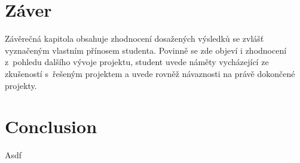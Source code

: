 \chapter*{Záver}

Závěrečná kapitola obsahuje zhodnocení dosažených výsledků se zvlášť vyznačeným vlastním přínosem studenta.
Povinně se zde objeví i zhodnocení z~pohledu dalšího vývoje projektu, student uvede náměty vycházející ze zkušeností s~řešeným projektem a uvede rovněž návaznosti na právě dokončené projekty.

\begingroup
\vspace{20mm}
\let\clearpage\relax
\chapter*{Conclusion}
\endgroup
Asdf

\newpage
